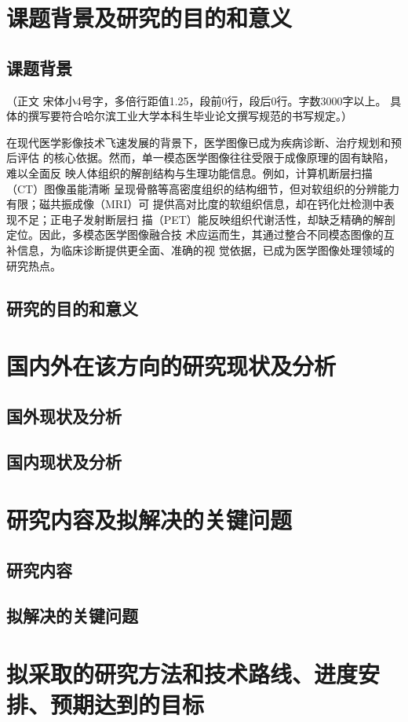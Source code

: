 \section{课题背景及研究的目的和意义}
\subsection{课题背景}
（正文  宋体小4号字，多倍行距值1.25，段前0行，段后0行。字数3000字以上。
具体的撰写要符合哈尔滨工业大学本科生毕业论文撰写规范的书写规定。）
\cite{hithesis2017}

在现代医学影像技术飞速发展的背景下，医学图像已成为疾病诊断、治疗规划和预后评估
的核心依据。然而，单一模态医学图像往往受限于成像原理的固有缺陷，难以全面反
映人体组织的解剖结构与生理功能信息。例如，计算机断层扫描（CT）图像虽能清晰
呈现骨骼等高密度组织的结构细节，但对软组织的分辨能力有限；磁共振成像（MRI）可
提供高对比度的软组织信息，却在钙化灶检测中表现不足；正电子发射断层扫
描（PET）能反映组织代谢活性，却缺乏精确的解剖定位。因此，多模态医学图像融合技
术应运而生，其通过整合不同模态图像的互补信息，为临床诊断提供更全面、准确的视
觉依据，已成为医学图像处理领域的研究热点。

\subsection{研究的目的和意义}
\section{国内外在该方向的研究现状及分析}
\subsection{国外现状及分析}
\subsection{国内现状及分析}
\section{研究内容及拟解决的关键问题}
\subsection{研究内容}
\subsection{拟解决的关键问题}
\section{拟采取的研究方法和技术路线、进度安排、预期达到的目标}
